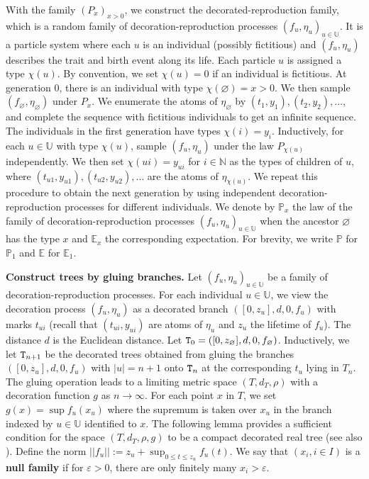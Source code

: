 \documentclass[12pt]{article}
\numberwithin{equation}{section}
\theoremstyle{plain}
\theoremstyle{definition}
\begin{document}
With the family $(P_x)_{x>0}$, we construct the decorated-reproduction family, which is a random family of decoration-reproduction processes $(f_u,\eta_u)_{u\in \mathbb{U}}$. It is a particle system where each $u$ is an individual (possibly fictitious) and $(f_u, \eta_u)$ describes the trait and birth event along its life. Each particle $u$ is assigned a type $\chi(u)$. By convention, we set $\chi(u) = 0$ if an individual is fictitious. At generation $0$, there is an individual with type $\chi(\varnothing) = x>0$. We then sample $(f_{\varnothing}, \eta_{\varnothing})$ under $P_x$. We enumerate the atoms of $\eta_\varnothing$ by $(t_1,y_1),(t_2,y_2),\dots$, and complete the sequence with fictitious individuals to get an infinite sequence. The individuals in the first generation have types $\chi(i) = y_i$. Inductively, for each $u\in \mathbb{U}$ with type $\chi(u)$, sample $(f_u,\eta_u)$ under the law $P_{\chi(u)}$ independently. We then set $\chi(ui)=y_{ui}$ for $i\in \mathbb{N}$ as the types of children of $u$, where $ ( t_{u1}, y_{u1}),(t_{u2}, y_{u2}),\dots$ are the atoms of $\eta_{\chi(u)}$. We repeat this procedure to obtain the next generation by using independent decoration-reproduction processes for different individuals. We denote by $\mathbb{P}_x$ the law of the family of decoration-reproduction processes $(f_u,\eta_u)_{u\in \mathbb{U}}$ when the ancestor $\varnothing$ has the type $x$ and $\mathbb{E}_x$ the corresponding expectation. For brevity, we write $\mathbb P$ for $\mathbb P_1$ and $\mathbb E$ for $\mathbb E_1$.

\bigskip

\noindent \textbf{Construct trees by gluing branches.}
Let $(f_u, \eta_u)_{u\in\mathbb{U}}$ be a family of decoration-reproduction processes. For each individual $u\in \mathbb{U}$, we view the decoration process $(f_u, \eta_u)$ as a decorated branch $([0, z_u], d, 0, f_u)$ with marks $t_{ui}$ (recall that $(t_{ui}, y_{ui})$ are atoms of $\eta_u$ and $z_u$ the lifetime of $f_u$). The distance $d$ is the Euclidean distance. Let ${\tt T}_0 = ([0, z_\varnothing], d, 0, f_\varnothing)$. Inductively, we let ${\tt T}_{n+1}$ be the decorated trees obtained from gluing the branches $([0, z_u], d, 0, f_u)$ with $|u| = n+1$ onto ${\tt T}_n$ at the corresponding $t_{u}$ lying in $T_n$. The gluing operation leads to a limiting metric space $(T, d_T, \rho)$ with a decoration function $g$ as $n\to\infty$. For each point $x$ in $T$, we set $g(x) = \sup f_u(x_u)$ where the supremum is taken over $x_u$ in the branch indexed by $u\in \mathbb U$ identified to $x$. The following lemma provides a sufficient condition for the space $(T, d_T, \rho,g)$ to be a compact decorated real tree (see also \cite[Section 2]{senizergues2020growing}). Define the norm $||f_u||:=z_u+\sup_{0\le t\le z_u}f_u(t)$. We say that $(x_i, i\in I)$ is a \textbf{null family} if for $\varepsilon>0$, there are only finitely many $x_i>\varepsilon$.
\end{document}
